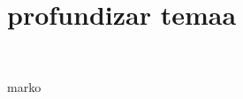 \section{profundizar temaa} 
\textbf{}\\
\begin{flushleft}


\begin{itemize}

marko


	


\end{itemize} 


\end{flushleft}